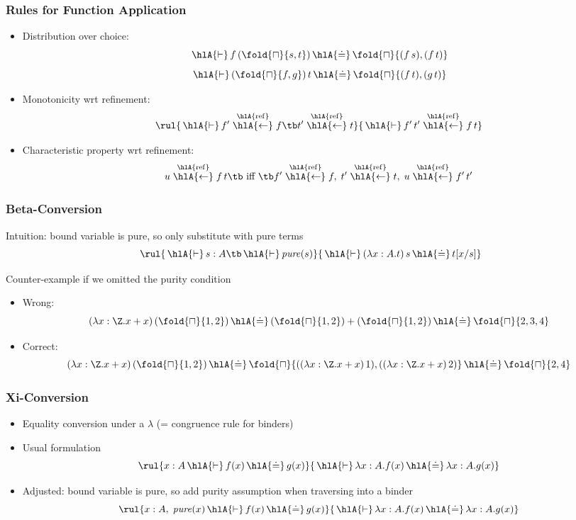 \documentclass{beamer}
\def\choice#1{\fold{\sqcap}{#1}}
\def\pure#1{\mathit{pure}(#1)}
\def\refine#1#2{#1\stackrel{\hlA{\mathrm{ref}}}{\hlA{\leftarrow}}#2}
\def\der{\,\hlA{\vdash}\,}
\def\syneq{\,\hlA{\doteq}\,}
\begin{document}
\begin{frame}\frametitle{Rules for Function Application}
\begin{itemize}
\item Distribution over choice:
\[\der f\,(\choice{s,t}) \syneq \choice{(f\,s),(f\,t)}\]
\[\der (\choice{f,g})\,t \syneq \choice{(f\,t),(g\,t)}\]
\item Monotonicity wrt refinement:
\[\rul{\der \refine{f'}{f} \tb \refine{t'}{t}}{\der\refine{f'\,t'}{f\,t}}\]
\item Characteristic property wrt refinement:
 \[\refine{u}{f\,t} \tb\text{ iff }\tb \refine{f'}{f},\;\refine{t'}{t},\; \refine{u}{f'\,t'}\]
\end{itemize}

\end{frame}


\begin{frame}\frametitle{Beta-Conversion}
Intuition: bound variable is pure, so only substitute with pure terms
\[\rul{\der s:A \tb \der\pure{s}}{\der (\lambda x:A.t)\,s \syneq t[x/s]}\]

Counter-example if we omitted the purity condition
\begin{itemize}
\item Wrong:
\[(\lambda x:\Z.x+x)\,(\choice{1,2})\syneq (\choice{1,2})+(\choice{1,2})\syneq\choice{2,3,4}\]
\item Correct:
\[(\lambda x:\Z.x+x)\,(\choice{1,2})\syneq \choice{((\lambda x:\Z.x+x)\,1),((\lambda x:\Z.x+x)\,2)}\syneq\choice{2,4}\]
\end{itemize}
\end{frame}

\begin{frame}\frametitle{Xi-Conversion}
\begin{itemize}
\item Equality conversion under a $\lambda$ (= congruence rule for binders)
\item Usual formulation
\[\rul{x:A\der f(x)\syneq g(x)}{\der \lambda x:A.f(x)\syneq \lambda x:A.g(x)}\]
\item Adjusted: bound variable is pure, so add purity assumption when traversing into a binder
\[\rul{x:A,\;\pure{x}\der f(x)\syneq g(x)}{\der \lambda x:A.f(x)\syneq \lambda x:A.g(x)}\]
\end{itemize}
\end{frame}
\end{document}
